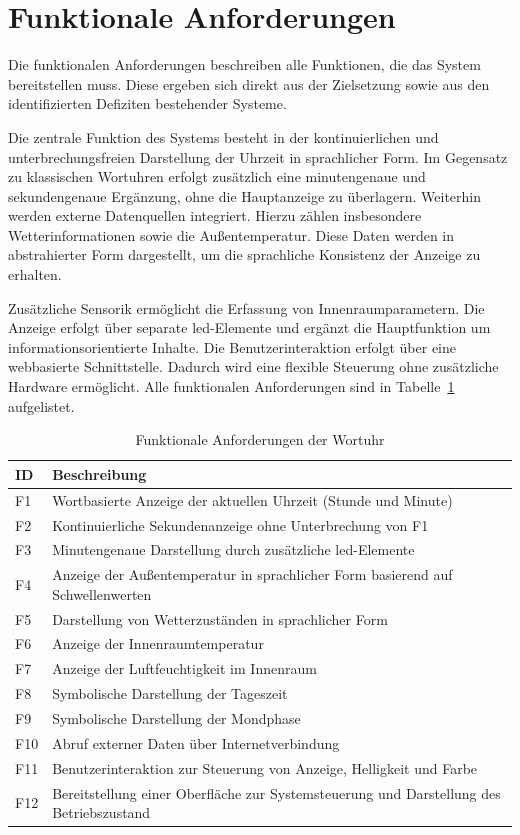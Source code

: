 \section{Funktionale Anforderungen}
Die funktionalen Anforderungen beschreiben alle Funktionen, die das System bereitstellen muss.
Diese ergeben sich direkt aus der Zielsetzung sowie aus den identifizierten Defiziten bestehender Systeme.

Die zentrale Funktion des Systems besteht in der kontinuierlichen und unterbrechungsfreien Darstellung der Uhrzeit in sprachlicher Form.
Im Gegensatz zu klassischen Wortuhren erfolgt zusätzlich eine minutengenaue und sekundengenaue Ergänzung, ohne die Hauptanzeige zu überlagern.
Weiterhin werden externe Datenquellen integriert.
Hierzu zählen insbesondere Wetterinformationen sowie die Außentemperatur.
Diese Daten werden in abstrahierter Form dargestellt, um die sprachliche Konsistenz der Anzeige zu erhalten.

Zusätzliche Sensorik ermöglicht die Erfassung von Innenraumparametern.
Die Anzeige erfolgt über separate \gls{led}-Elemente und ergänzt die Hauptfunktion um informationsorientierte Inhalte.
Die Benutzerinteraktion erfolgt über eine webbasierte Schnittstelle.
Dadurch wird eine flexible Steuerung ohne zusätzliche Hardware ermöglicht.
Alle funktionalen Anforderungen sind in Tabelle~\ref{tab:Funktionale Anforderung} aufgelistet.

\begin{table}[H]
\centering
\begin{tabular}{p{3cm} p{9cm}}
\textbf{ID} & \textbf{Beschreibung} \\
\hline
F1 & Wortbasierte Anzeige der aktuellen Uhrzeit (Stunde und Minute) \\
F2 & Kontinuierliche Sekundenanzeige ohne Unterbrechung von F1 \\
F3 & Minutengenaue Darstellung durch zusätzliche \gls{led}-Elemente \\
F4 & Anzeige der Außentemperatur in sprachlicher Form basierend auf Schwellenwerten \\
F5 & Darstellung von Wetterzuständen in sprachlicher Form \\
F6 & Anzeige der Innenraumtemperatur \\
F7 & Anzeige der Luftfeuchtigkeit im Innenraum \\
F8 & Symbolische Darstellung der Tageszeit \\
F9 & Symbolische Darstellung der Mondphase \\
F10 & Abruf externer Daten über Internetverbindung \\
F11 & Benutzerinteraktion zur Steuerung von Anzeige, Helligkeit und Farbe \\
F12 & Bereitstellung einer Oberfläche zur Systemsteuerung und Darstellung des Betriebszustand \\
\end{tabular}
\caption{Funktionale Anforderungen der Wortuhr}
\label{tab:Funktionale Anforderung}
\end{table}

